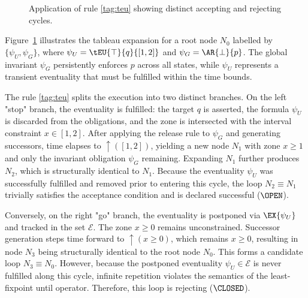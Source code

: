 \begin{figure}[h]
\caption{Application of rule \ref{tag:teu} showing distinct accepting and rejecting cycles.}\label{fig:accepting_rejecting_loops}
\end{figure}

\begin{example}
Figure~\ref{fig:accepting_rejecting_loops} illustrates the tableau expansion for a root node $N_0$ labelled by $\{\psi_U, \psi_G\}$, where $\psi_U = \tEU{\top}{q}{[1,2]}$ and $\psi_G = \AR{\bot}{p}$. The global invariant $\psi_G$ persistently enforces $p$ across all states, while $\psi_U$ represents a transient eventuality that must be fulfilled within the time bounds.

The rule \ref{tag:teu} splits the execution into two distinct branches. On the left "stop" branch, the eventuality is fulfilled: the target $q$ is asserted, the formula $\psi_U$ is discarded from the obligations, and the zone is intersected with the interval constraint $x \in [1,2]$. After applying the release rule to $\psi_G$ and generating successors, time elapses to $\uparrow([1,2])$, yielding a new node $N_1$ with zone $x \ge 1$ and only the invariant obligation $\psi_G$ remaining. Expanding $N_1$ further produces $N_2$, which is structurally identical to $N_1$. Because the eventuality $\psi_U$ was successfully fulfilled and removed prior to entering this cycle, the loop $N_2 \equiv N_1$ trivially satisfies the acceptance condition and is declared successful ($\OPEN$).

Conversely, on the right "go" branch, the eventuality is postponed via $\EX{\psi_U}$ and tracked in the set $\mathcal{E}$. The zone $x \ge 0$ remains unconstrained. Successor generation steps time forward to $\uparrow(x \ge 0)$, which remains $x \ge 0$, resulting in node $N_3$ being structurally identical to the root node $N_0$. This forms a candidate loop $N_3 \equiv N_0$. However, because the postponed eventuality $\psi_U \in \mathcal{E}$ is never fulfilled along this cycle, infinite repetition violates the semantics of the least-fixpoint until operator. Therefore, this loop is rejecting ($\CLOSED$).
\end{example}